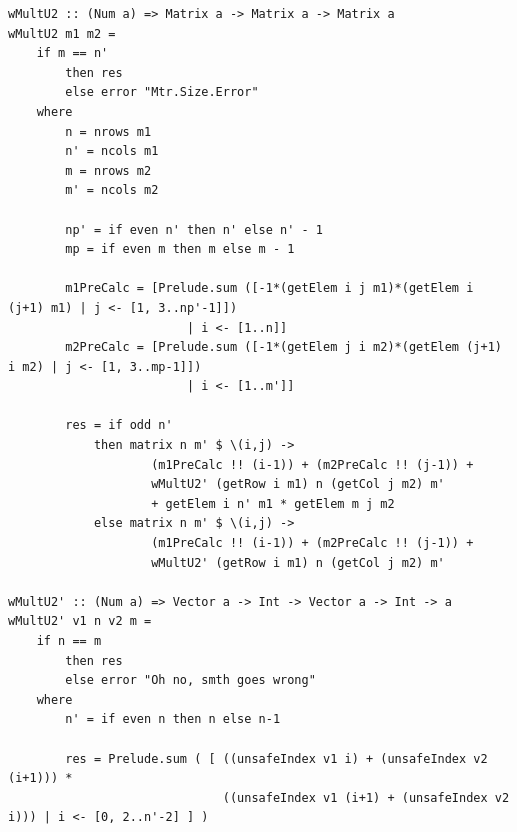 \documentclass[12pt]{report}
\begin{document}
\begin{lstlisting}[label=some-code,caption=Алгоритм Винограда модификация 2]
wMultU2 :: (Num a) => Matrix a -> Matrix a -> Matrix a
wMultU2 m1 m2 = 
    if m == n'
        then res
        else error "Mtr.Size.Error"
    where
        n = nrows m1
        n' = ncols m1
        m = nrows m2
        m' = ncols m2

        np' = if even n' then n' else n' - 1
        mp = if even m then m else m - 1

        m1PreCalc = [Prelude.sum ([-1*(getElem i j m1)*(getElem i (j+1) m1) | j <- [1, 3..np'-1]])
                         | i <- [1..n]]
        m2PreCalc = [Prelude.sum ([-1*(getElem j i m2)*(getElem (j+1) i m2) | j <- [1, 3..mp-1]])
                         | i <- [1..m']] 
                                                
        res = if odd n'
            then matrix n m' $ \(i,j) ->
                    (m1PreCalc !! (i-1)) + (m2PreCalc !! (j-1)) +  
                    wMultU2' (getRow i m1) n (getCol j m2) m' 
                    + getElem i n' m1 * getElem m j m2
            else matrix n m' $ \(i,j) ->
                    (m1PreCalc !! (i-1)) + (m2PreCalc !! (j-1)) +  
                    wMultU2' (getRow i m1) n (getCol j m2) m' 

wMultU2' :: (Num a) => Vector a -> Int -> Vector a -> Int -> a
wMultU2' v1 n v2 m = 
    if n == m
        then res
        else error "Oh no, smth goes wrong"
    where
        n' = if even n then n else n-1

        res = Prelude.sum ( [ ((unsafeIndex v1 i) + (unsafeIndex v2 (i+1))) * 
                              ((unsafeIndex v1 (i+1) + (unsafeIndex v2 i))) | i <- [0, 2..n'-2] ] )
\end{lstlisting}
\end{document}
